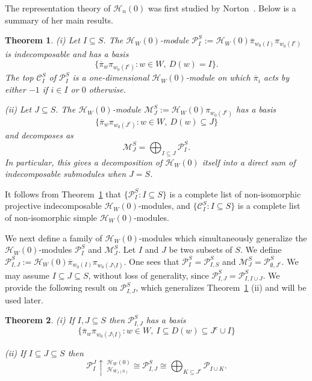\documentclass{amsart}
\newtheorem{theorem}{Theorem}[section]
\newtheorem*{Young's Rule}{Young's Rule}
\theoremstyle{definition}
\theoremstyle{remark}
\numberwithin{equation}{section}
\begin{document}
The representation theory of ${\mathcal{H}}_n(0)$ was first studied by Norton~\cite{Norton}. Below is a summary of her main results.

\begin{theorem}\label{thm:Norton}
(i) Let $I\subseteq S$. The ${\mathcal{H}}_W(0)$-module ${\mathcal{P}}_I^S:={\mathcal{H}}_W(0){\overline{\pi}}_{w_0(I)}\pi_{w_0(I^c)}$ is indecomposable and has a basis
\[
\{{\overline{\pi}}_w\pi_{w_0(I^c)}: w\in W,\ D(w) = I \}.
\] 
 The top ${\mathcal{C}}_I^S$ of ${\mathcal{P}}_I^S$ is a one-dimensional ${\mathcal{H}}_W(0)$-module on which ${\overline{\pi}}_i$ acts by either $-1$ if $i\in I$ or $0$ otherwise.

\noindent (ii) Let $J\subseteq S$. The ${\mathcal{H}}_W(0)$-module ${\mathcal{M}}_J^S:={\mathcal{H}}_W(0)\pi_{w_0(J^c)}$ has a basis 
\[ \{ {\overline{\pi}}_w\pi_{w_0(J^c)}: w\in W,\ D(w)\subseteq J \} \]
and decomposes as
\[ {\mathcal{M}}_J^S = \bigoplus_{I\subseteq J} {\mathcal{P}}_I^S. \]
In particular, this gives a decomposition of ${\mathcal{H}}_W(0)$ itself into a direct sum of indecomposable submodules when $J=S$.
\end{theorem}

It follows from Theorem~\ref{thm:Norton} that $\{{\mathcal{P}}_I^S: I\subseteq S\}$ is a complete list of non-isomorphic projective indecomposable ${\mathcal{H}}_W(0)$-modules, and $\{{\mathcal{C}}_I^S: I\subseteq S\}$ is a complete list of non-isomorphic simple ${\mathcal{H}}_W(0)$-modules. 
 
We next define a family of ${\mathcal{H}}_W(0)$-modules which simultaneously generalize the ${\mathcal{H}}_W(0)$-modules ${\mathcal{P}}_I^S$ and ${\mathcal{M}}_J^S$. Let $I$ and $J$ be two subsets of $S$. We define ${\mathcal{P}_{I,J}^S}:={\mathcal{H}}_W(0) {\overline{\pi}}_{w_0(I)} \pi_{w_0(J\setminus I)}$. One sees that ${\mathcal{P}}_I^S = {\mathcal{P}}_{I,S}^S$ and ${\mathcal{M}}_J^S = {\mathcal{P}}_{\emptyset,J^c}^S$. We may assume $I\subseteq J\subseteq S$, without loss of generality, since  ${\mathcal{P}_{I,J}^S} = {\mathcal{P}}_{I,I\cup J}^S$. We provide the following result on ${\mathcal{P}_{I,J}^S}$, which generalizes Theorem~\ref{thm:Norton} (ii) and will be used later.

\begin{theorem}\label{thm:IJS}
(i) If $I, J \subseteq S$ then ${\mathcal{P}_{I,J}^S}$ has a basis 
\begin{equation}\label{eq:BasisIJS}
\{ {\overline{\pi}}_w\pi_{w_0(J\setminus I)}: w\in W,\ I\subseteq D(w) \subseteq J^c \cup I\}
\end{equation}

\noindent(ii) If $I\subseteq J \subseteq S$ then 
\[
{\mathcal{P}}_I^J \uparrow\,_{{\mathcal{H}}_{W_J(0)}}^{{\mathcal{H}}_W(0)} \cong {\mathcal{P}_{I,J}^S}\cong  \bigoplus_{K\subseteq J^c} {\mathcal{P}}_{I\cup K}.
\]
\end{theorem}
\end{document}
